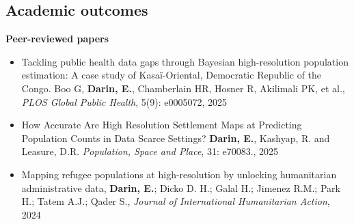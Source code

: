 \documentclass[
]{friggeri-cv}
\begin{document}
\clearpage

\begin{noside}
\section{Academic outcomes}
\textbf{Peer-reviewed papers}
\begin{itemize}
\item  Tackling public health data gaps through Bayesian high-resolution population estimation: A case study of Kasaï-Oriental, Democratic Republic of the Congo. Boo G, \textbf{Darin, E.}, Chamberlain HR, Hosner R, Akilimali PK, et al., \textit{PLOS Global Public Health}, 5(9): e0005072, 2025 \href{https://doi.org/10.1371/journal.pgph.0005072}{\scriptsize{}}

\item How Accurate Are High Resolution Settlement Maps at Predicting Population Counts in Data Scarce Settings?  \textbf{Darin, E.}, Kashyap, R. and Leasure, D.R. \textit{Population, Space and Place}, 31: e70083., 2025 \href{https://doi.org/10.1002/psp.70083}{\scriptsize{}}

\item Mapping refugee populations at high-resolution by unlocking humanitarian administrative data, \textbf{Darin, E.}; Dicko D. H.;  Galal H.; Jimenez R.M.; Park H.;  Tatem A.J.; Qader S., \textit{Journal of International Humanitarian Action}, 2024 \href{https://doi.org/10.1186/s41018-024-00157-6}{\scriptsize{}}


\end{itemize}
\end{noside}
\end{document}
